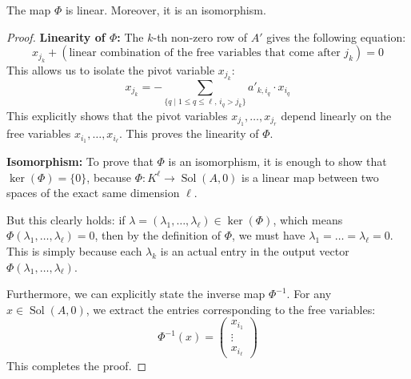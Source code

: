 \begin{proposition}
\label{prop:solution_map_isomorphism}
The map $\Phi$ is linear. Moreover, it is an isomorphism.
\end{proposition}

\begin{proof}
\textbf{Linearity of $\Phi$:} The $k$-th non-zero row of $A'$ gives the following equation:
\begin{equation*}
    x_{j_k} + (\text{linear combination of the free variables that come after } j_k) = 0
\end{equation*}
This allows us to isolate the pivot variable $x_{j_k}$:
\begin{equation*}
    x_{j_k} = - \sum_{\{q \mid 1 \le q \le \ell, \, i_q > j_k\}} a'_{k, i_q} \cdot x_{i_q}
\end{equation*}
This explicitly shows that the pivot variables $x_{j_1}, \dots, x_{j_r}$ depend linearly on the free variables $x_{i_1}, \dots, x_{i_\ell}$. This proves the linearity of $\Phi$.

\textbf{Isomorphism:} To prove that $\Phi$ is an isomorphism, it is enough to show that $\ker(\Phi) = \{0\}$, because $\Phi: K^\ell \to \operatorname{Sol}(A, 0)$ is a linear map between two spaces of the exact same dimension $\ell$.

But this clearly holds: if $\lambda = (\lambda_1, \dots, \lambda_\ell) \in \ker(\Phi)$, which means $\Phi(\lambda_1, \dots, \lambda_\ell) = 0$, then by the definition of $\Phi$, we must have $\lambda_1 = \dots = \lambda_\ell = 0$. This is simply because each $\lambda_k$ is an actual entry in the output vector $\Phi(\lambda_1, \dots, \lambda_\ell)$.

Furthermore, we can explicitly state the inverse map $\Phi^{-1}$. For any $x \in \operatorname{Sol}(A, 0)$, we extract the entries corresponding to the free variables:
\begin{equation*}
    \Phi^{-1}(x) = \begin{pmatrix} x_{i_1} \\ \vdots \\ x_{i_\ell} \end{pmatrix}
\end{equation*}
This completes the proof.
\end{proof}

